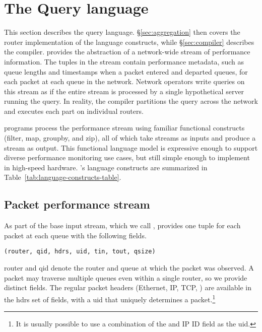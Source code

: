 \section{The \TheSystem Query language}
\label{sec:language}
This section describes the \TheSystem query language.  \S\ref{sec:aggregation}
then covers the router implementation of the language constructs, while
\S\ref{sec:compiler} describes the compiler.  \TheSystem provides the
abstraction of a network-wide stream of performance information. The tuples in
the stream contain performance metadata, such as queue lengths and timestamps
when a packet entered and departed queues, for each packet at each queue in the
network. Network operators write queries on this stream as if the entire stream
is processed by a single hypothetical server running the query. In reality, the
compiler partitions the query across the network and executes each part on
individual routers.

\TheSystem programs process the performance stream using familiar functional
constructs ({\ct filter}, {\ct map}, {\ct groupby}, and {\ct zip}), all of
which take streams as inputs and produce a stream as output. This functional
language model is expressive enough to support diverse performance monitoring
use cases, but still simple enough to implement in high-speed hardware.
\TheSystem's language constructs are summarized in
Table~\ref{tab:language-constructs-table}.



\subsection{Packet performance stream}
\label{ss:pq_perf_stream}

As part of the base input stream, which we
call {\ct \pktlog}, \TheSystem provides one tuple for each packet at each queue
with the following fields.

\begin{lstlisting}
(router, qid, hdrs, uid, tin, tout, qsize)
\end{lstlisting}

{\ct router} and {\ct qid} denote the router and queue at which the
packet was observed. A packet may traverse multiple queues even within a single
router, so we provide distinct fields. The regular packet headers (Ethernet,
IP, TCP, \etc) are available in the {\ct hdrs} set of fields, with a {\ct uid}
that uniquely determines a packet.\footnote{It is usually possible to
use a combination of the \txtftuple and IP ID field as the {\ctfoot uid}.}

